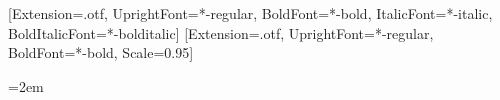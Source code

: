 \usepackage{fontspec}
\setmainfont{texgyretermes}[Extension=.otf, UprightFont=*-regular, BoldFont=*-bold, ItalicFont=*-italic, BoldItalicFont=*-bolditalic]%
\setmonofont{texgyrecursor}[Extension=.otf, UprightFont=*-regular, BoldFont=*-bold, Scale=0.95]
\newcommand{\lightfont}{\mdseries}
\newcommand{\mediumfont}{\bfseries}

\usepackage[a4paper,margin=14mm]{geometry}
\usepackage{xcolor}
\usepackage{tikz}
\usetikzlibrary{arrows.meta,positioning,calc,fit,backgrounds}
\usepackage{graphicx}
\usepackage{enumitem}
\usepackage{array}
\usepackage{colortbl}
\usepackage{microtype}
\usepackage{etoolbox}
\usepackage{xstring}

\color{ink}

\setlength{\parindent}{0pt}
\setlength{\parskip}{0pt}
\setlength{\columnsep}{6mm}
\pagestyle{empty}
\linespread{1.02}
\emergencystretch=2em

\newcommand{\rsection}[2][0mm]{%
  \par\vspace{\dimexpr 4.5mm+#1\relax}%
  {\fontsize{12}{14}\selectfont\mediumfont #2\par}%
  \vspace{1.5mm}}

